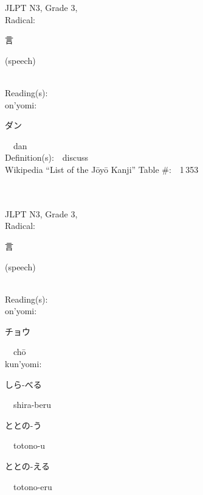 \begin{multicols}{2}
{JLPT N3, Grade 3, \\Radical:\ \ {\begin{CJK}{UTF8}{min} 言 \end{CJK}} (speech) } \\
Reading(s):\ \ \\
{\hspace*{1em}}on'yomi:\ \ \\
{\hspace*{2em}}{\begin{CJK}{UTF8}{min} ダン \end{CJK}}\ \ dan\ \ \\
Definition(s):\ \ discuss \\
Wikipedia ``List of the J\=oy\=o Kanji'' Table \#:\ \ 1\,353 \\
\ \ \\
{\fontsize{34pt}{40pt}  }\ \ \\  %
{JLPT N3, Grade 3, \\Radical:\ \ {\begin{CJK}{UTF8}{min} 言 \end{CJK}} (speech) } \\
Reading(s):\ \ \\
{\hspace*{1em}}on'yomi:\ \ \\
{\hspace*{2em}}{\begin{CJK}{UTF8}{min} チョウ \end{CJK}}\ \ ch\=o\ \ \\
{\hspace*{1em}}kun'yomi:\ \ \\
{\hspace*{2em}}{\begin{CJK}{UTF8}{min} しら-べる \end{CJK}}\ \ shira-beru\ \ \\
{\hspace*{2em}}{\begin{CJK}{UTF8}{min} ととの-う \end{CJK}}\ \ totono-u\ \ \\
{\hspace*{2em}}{\begin{CJK}{UTF8}{min} ととの-える \end{CJK}}\ \ totono-eru\ \ \\

\end{multicols}
